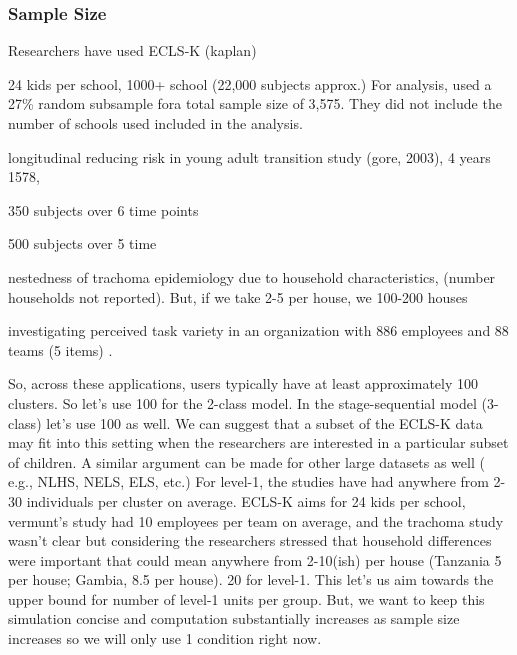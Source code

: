\documentclass[man, noextraspace, floatsintext, 12pt]{apa7}
\begin{document}
\subsubsection{Sample Size}

Researchers have used ECLS-K (kaplan)

24 kids per school, 1000+ school (22,000 subjects approx.)
For analysis, \textcite{Kaplan2005} used a 27\% random subsample fora total sample size of 3,575.
They did not include the number of schools used included in the analysis.

\citep{Auerbach2006} 
longitudinal reducing risk in young adult transition study (gore, 2003), 4 years
1578, 


\citep{Koukounari2013}
350 subjects over 6 time points

500 subjects over 5 time

nestedness of trachoma epidemiology  due to household characteristics, (number households not reported).
But, if we take 2-5 per house, we 100-200 houses




investigating perceived task variety in an organization with 886 employees and 88 teams (5 items) \citep{Vermunt2005}.

So, across these applications, users typically have at least approximately 100 clusters.
So let's use 100 for the 2-class model.
In the stage-sequential model (3-class) let's use 100 as well. We can suggest that a subset of the ECLS-K data may fit into this setting when the researchers are interested in a particular subset of children. A similar argument can be made for other large datasets as well ( e.g., NLHS, NELS, ELS, etc.)
For level-1, the studies have had anywhere from 2-30 individuals per cluster on average.
ECLS-K aims for 24 kids per school, vermunt's study had 10 employees per team on average, and the trachoma study wasn't clear but considering the researchers stressed that household differences were important that could mean anywhere from 2-10(ish) per house (Tanzania 5 per house; Gambia, 8.5 per house).
20 for level-1.
This let's us aim towards the upper bound for number of level-1 units per group.
But, we want to keep this simulation concise and computation substantially increases as sample size increases so we will only use 1 condition right now.
\end{document}
